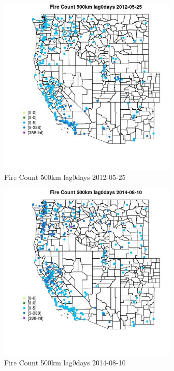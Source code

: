 \begin{figure} 
\centering  
\includegraphics[width=0.77\textwidth]{Code_Outputs/Report_ML_input_PM25_Step4_part_e_de_duplicated_aves_compiled_2019-05-18wNAs_MapObsFire_Count_500km_lag0days2012-05-25.jpg} 
\caption{\label{fig:Report_ML_input_PM25_Step4_part_e_de_duplicated_aves_compiled_2019-05-18wNAsMapObsFire_Count_500km_lag0days2012-05-25}Fire Count 500km lag0days 2012-05-25} 
\end{figure} 
 

\begin{figure} 
\centering  
\includegraphics[width=0.77\textwidth]{Code_Outputs/Report_ML_input_PM25_Step4_part_e_de_duplicated_aves_compiled_2019-05-18wNAs_MapObsFire_Count_500km_lag0days2014-08-10.jpg} 
\caption{\label{fig:Report_ML_input_PM25_Step4_part_e_de_duplicated_aves_compiled_2019-05-18wNAsMapObsFire_Count_500km_lag0days2014-08-10}Fire Count 500km lag0days 2014-08-10} 
\end{figure} 
 

